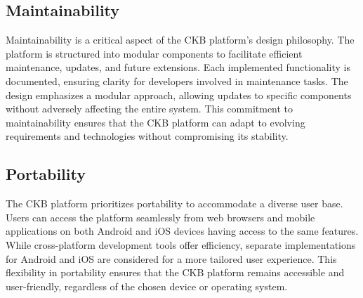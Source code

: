 \subsection{Maintainability}
\label{subsec:maintainability}%
Maintainability is a critical aspect of the CKB platform's design philosophy. The platform is structured into modular components to facilitate efficient maintenance, updates, and future extensions. 
Each implemented functionality is documented, ensuring clarity for developers involved in maintenance tasks. 
The design emphasizes a modular approach, allowing updates to specific components without adversely affecting the entire system. 
This commitment to maintainability ensures that the CKB platform can adapt to evolving requirements and technologies without compromising its stability.

\subsection{Portability}
\label{subsec:portability}%
The CKB platform prioritizes portability to accommodate a diverse user base. Users can access the platform seamlessly from web browsers and mobile applications on both Android and iOS devices having access to the same features. 
While cross-platform development tools offer efficiency, separate implementations for Android and iOS are considered for a more tailored user experience. 
This flexibility in portability ensures that the CKB platform remains accessible and user-friendly, regardless of the chosen device or operating system.
